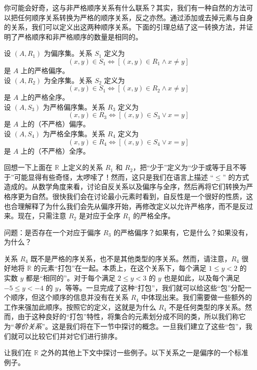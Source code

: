 你可能会好奇，这与非严格顺序关系有什么联系？其实，我们有一种自然的方法可以把任何顺序关系转换为严格的顺序关系，反之亦然。通过添加或去掉元素与自身的关系，我们可以定义出这两种顺序关系。下面的引理总结了这一转换方法，并证明了严格顺序和非严格顺序的数量是相同的。

\begin{lemma}
    设 $(A, R_1)$ 为偏序集。关系 $S_1$ 定义为
    \[(x, y) \in S_1 \iff [(x, y) \in R_1 \land x \ne y]\]
    是 $A$ 上的严格偏序。\\

    设 $(A, R_2)$ 为全序集。关系 $S_2$ 定义为
    \[(x, y) \in S_1 \iff [(x, y) \in R_2 \land x \ne y]\]
    是 $A$ 上的严格全序。\\

    设 $(A, S_3)$ 为严格偏序集。关系 $R_3$ 定义为
    \[(x, y) \in R_3 \iff [(x, y) \in S_3 \lor x = y]\]
    是 $A$ 上的（不严格）偏序。\\

    设 $(A, S_4)$ 为严格全序集。关系 $R_4$ 定义为
    \[(x, y) \in R_4 \iff [(x, y) \in S_4 \lor x = y]\]
    是 $A$ 上的（不严格）全序。
\end{lemma}

回想一下上面在 $\mathbb{R}$ 上定义的关系 $R_1$ 和 $R_2$，把``少于''定义为``少于或等于且不等于''可能显得有些奇怪，太啰嗦了！然而，这只是我们在语言上描述 ``$\le$'' 的方式造成的。从数学角度来看，讨论自反关系以及偏序与全序，然后再将它们转换为严格序更为自然。很快我们会在讨论最小元素时看到，自反性是一个很好的性质，这也合理解释了为什么我们会先从偏序开始，再修改定义以允许严格序，而不是反过来。现在，只需注意 $R_2$ 是对应于全序 $R_1$ 的严格全序。

问题：是否存在一个对应于偏序 $R_3$ 的严格偏序？如果有，它是什么？如果没有，为什么？

关系 $R_4$ 既不是严格的序关系，也不是其他类型的序关系。然而，请注意，$R_4$ 很好地将 $\mathbb{R}$ 的元素``打包''在一起。本质上，在这个关系下，每个满足 $1 \le y < 2$ 的实数 $y$ 都是``相同的''。对于每个满足 $2 \le y < 3$ 的 $y$ 也是如此，以及每个满足 $-5 \le y < -4$ 的 $y$，等等。一旦完成了这种``打包''，我们就可以给这些``包''分配一个顺序，但这个顺序的信息并没有在关系 $R_4$ 中体现出来。我们需要做一些额外的工作来强加此顺序。按照它的定义，这就是为什么 $R_4$ 不是任何类型的序关系。然而，由于这种良好的``打包''特性，将集合的元素划分成不同的类，所以我们称它为``\emph{等价关系}''。这是我们将在下一节中探讨的概念。一旦我们建立了这些``包''，我们就可以比较它们并对它们进行排序。

让我们在 $\mathbb{R}$ 之外的其他上下文中探讨一些例子。以下关系之一是偏序的一个标准例子。\\

